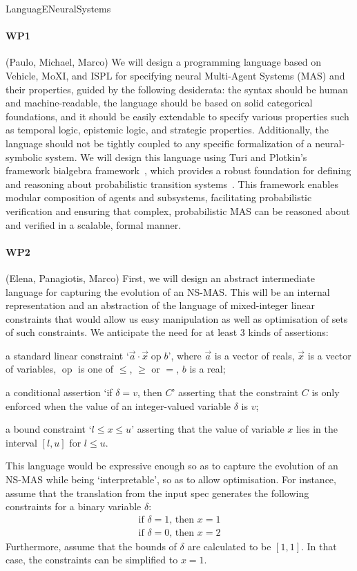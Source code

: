 \documentclass[11pt]{article}
\newcommand{\op}{\mathop{\text{op}}}
\begin{document}
LanguagENeuralSystems

\paragraph{WP1} (Paulo, Michael, Marco)
We will design a programming language based on Vehicle, MoXI, and ISPL for
specifying neural Multi-Agent Systems (MAS) and their properties, guided by the
following desiderata: the syntax should be human and machine-readable, the
language should be based on solid categorical foundations, and it should be
easily extendable to specify various properties such as temporal logic,
epistemic logic, and strategic properties. Additionally, the language should not
be tightly coupled to any specific formalization of a neural-symbolic system. We
will design this language using Turi and Plotkin's framework bialgebra
framework~\cite{TuriP97}, which provides a robust foundation for defining and
reasoning about probabilistic transition systems~\cite{LanotteT09}. This
framework enables modular composition of agents and subsystems, facilitating
probabilistic verification and ensuring that complex, probabilistic MAS can be
reasoned about and verified in a scalable, formal manner.

\paragraph{WP2} (Elena, Panagiotis, Marco) First, we will design an
abstract intermediate language for capturing the evolution of an
NS-MAS. This will be an internal representation and an abstraction of
the language of mixed-integer linear constraints that would allow us
easy manipulation as well as optimisation of sets of such
constraints. We anticipate the need for at least 3 kinds of
assertions:
\begin{inparaenum}[\it (i)]
\item a standard linear constraint `$\vec{a} \cdot \vec{x} \op b$',
  where $\vec{a}$ is a vector of reals, $\vec{x}$ is a vector of
  variables, $\op$ is one of $\leq$, $\geq$ or $=$, $b$ is a real;
\item a conditional assertion `if $\delta = v$, then $C$' asserting
  that the constraint $C$ is only enforced when the value of an
  integer-valued variable $\delta$ is $v$;
\item a bound constraint `$l \leq x \leq u$' asserting that the value
  of variable $x$ lies in the interval $[l,u]$ for $l\leq u$.
\end{inparaenum}
This language would be expressive enough so as to capture the
evolution of an NS-MAS while being `interpretable', so as to allow
optimisation.  For instance, assume that the translation from the
input spec generates the following constraints for a binary variable
$\delta$:
\[
  \begin{array}{l}
    \text{if }\delta = 1\text{, then }x = 1\\
    \text{if }\delta = 0\text{, then }x = 2
  \end{array}
\]
Furthermore, assume that the bounds of $\delta$ are calculated to be
$[1,1]$. In that case, the constraints can be simplified to $x=1$.
\end{document}
